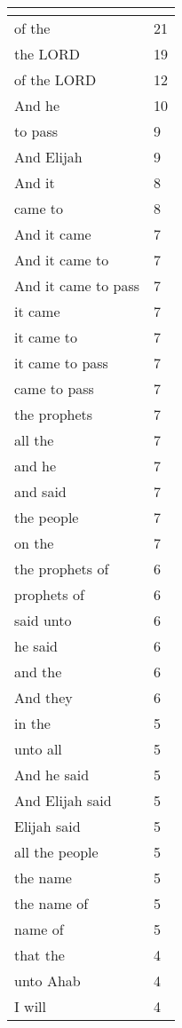 \begin{center}
\begin{longtable}{|p{3.0in}|p{0.5in}|}
\hline \multicolumn{2}{c}{{ }} \\ \hline
\endfoot 
of the & 21\\ \hline 
the LORD & 19\\ \hline 
of the LORD & 12\\ \hline 
And he & 10\\ \hline 
to pass & 9\\ \hline 
And Elijah & 9\\ \hline 
And it & 8\\ \hline 
came to & 8\\ \hline 
And it came & 7\\ \hline 
And it came to & 7\\ \hline 
And it came to pass & 7\\ \hline 
it came & 7\\ \hline 
it came to & 7\\ \hline 
it came to pass & 7\\ \hline 
came to pass & 7\\ \hline 
the prophets & 7\\ \hline 
all the & 7\\ \hline 
and he & 7\\ \hline 
and said & 7\\ \hline 
the people & 7\\ \hline 
on the & 7\\ \hline 
the prophets of & 6\\ \hline 
prophets of & 6\\ \hline 
said unto & 6\\ \hline 
he said & 6\\ \hline 
and the & 6\\ \hline 
And they & 6\\ \hline 
in the & 5\\ \hline 
unto all & 5\\ \hline 
And he said & 5\\ \hline 
And Elijah said & 5\\ \hline 
Elijah said & 5\\ \hline 
all the people & 5\\ \hline 
the name & 5\\ \hline 
the name of & 5\\ \hline 
name of & 5\\ \hline 
that the & 4\\ \hline 
unto Ahab & 4\\ \hline 
I will & 4\\ \hline 

\end{longtable}
\end{center}

